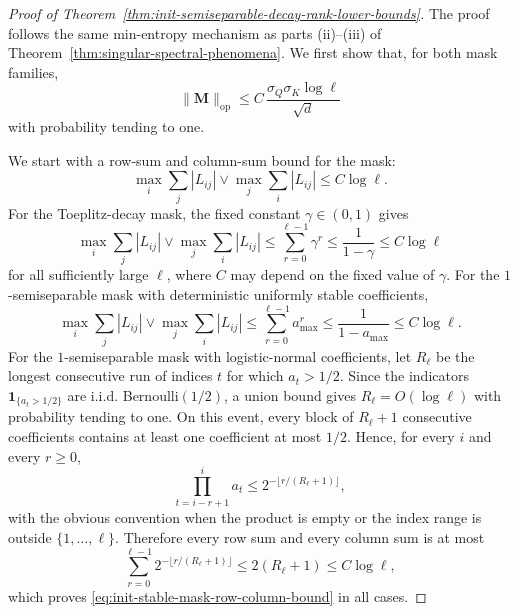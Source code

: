 \documentclass{article}
\newcommand{\op}{\operatorname{op}}
\newcommand{\one}{\mathbf{1}}
\newcommand{\bM}{\mathbf{M}}
\theoremstyle{definition}
\theoremstyle{remark}
\begin{document}
\begin{proof}[Proof of Theorem~\ref{thm:init-semiseparable-decay-rank-lower-bounds}]
The proof follows the same min-entropy mechanism as parts (ii)--(iii) of
Theorem~\ref{thm:singular-spectral-phenomena}.  We first show that, for both
mask families,
\begin{equation}
    \|\bM\|_{\op}
    \leq
    C\,\frac{\sigma_Q\sigma_K\log\ell}{\sqrt d}
    \label{eq:init-stable-mask-op-bound}
\end{equation}
with probability tending to one.

We start with a row-sum and column-sum bound for the mask:
\begin{equation}
    \max_i\sum_j |L_{ij}|
    \vee
    \max_j\sum_i |L_{ij}|
    \leq
    C\log\ell.
    \label{eq:init-stable-mask-row-column-bound}
\end{equation}
For the Toeplitz-decay mask, the fixed constant $\gamma\in(0,1)$ gives
\[
    \max_i\sum_j |L_{ij}|
    \vee
    \max_j\sum_i |L_{ij}|
    \leq
    \sum_{r=0}^{\ell-1}\gamma^r
    \leq
    \frac1{1-\gamma}
    \leq
    C\log\ell
\]
for all sufficiently large $\ell$, where $C$ may depend on the fixed value of
$\gamma$.  For the $1$-semiseparable mask with deterministic uniformly stable
coefficients,
\[
    \max_i\sum_j |L_{ij}|
    \vee
    \max_j\sum_i |L_{ij}|
    \leq
    \sum_{r=0}^{\ell-1}a_{\max}^r
    \leq
    \frac1{1-a_{\max}}
    \leq
    C\log\ell.
\]
For the $1$-semiseparable mask with logistic-normal coefficients, let $R_\ell$
be the longest consecutive run of indices $t$ for which $a_t>1/2$.  Since the
indicators $\one_{\{a_t>1/2\}}$ are i.i.d. Bernoulli$(1/2)$, a union bound gives
$R_\ell=O(\log\ell)$ with probability tending to one.  On this event, every
block of $R_\ell+1$ consecutive coefficients contains at least one coefficient
at most $1/2$.  Hence, for every $i$ and every $r\geq0$,
\[
    \prod_{t=i-r+1}^{i}a_t
    \leq
    2^{-\lfloor r/(R_\ell+1)\rfloor},
\]
with the obvious convention when the product is empty or the index range is
outside $\{1,\ldots,\ell\}$.  Therefore every row sum and every column sum is at
most
\[
    \sum_{r=0}^{\ell-1}2^{-\lfloor r/(R_\ell+1)\rfloor}
    \leq
    2(R_\ell+1)
    \leq
    C\log\ell,
\]
which proves \eqref{eq:init-stable-mask-row-column-bound} in all cases.


\end{proof}
\end{document}
